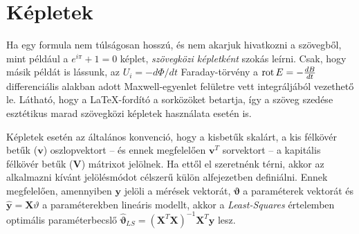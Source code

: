 \section{Képletek}
Ha egy formula nem túlságosan hosszú, és nem akarjuk hivatkozni a szövegből, mint például a $e^{i\pi}+1=0$ képlet, \emph{szövegközi képletként} szokás leírni. Csak, hogy másik példát is lássunk, az $U_i=-d\Phi/dt$ Faraday-törvény a $\rot E=-\frac{dB}{dt}$ differenciális alakban adott Maxwell-egyenlet felületre vett integráljából vezethető le. Látható, hogy a \LaTeX-fordító a sorközöket betartja, így a szöveg szedése esztétikus marad szövegközi képletek használata esetén is.

Képletek esetén az általános konvenció, hogy a kisbetűk skalárt, a kis félkövér betűk ($\mathbf{v}$) oszlopvektort -- és ennek megfelelően $\mathbf{v}^T$ sorvektort -- a kapitális félkövér betűk ($\mathbf{V}$) mátrixot jelölnek. Ha ettől el szeretnénk térni, akkor az alkalmazni kívánt jelölésmódot célszerű külön alfejezetben definiálni. Ennek megfelelően, amennyiben $\mathbf{y}$ jelöli a mérések vektorát, $\mathbf{\vartheta}$ a paraméterek vektorát és $\hat{\mathbf{y}}=\mathbf{X}\vartheta$ a paraméterekben lineáris modellt, akkor a \emph{Least-Squares} értelemben optimális paraméterbecslő $\hat{\mathbf{\vartheta}}_{LS}=(\mathbf{X}^T\mathbf{X})^{-1}\mathbf{X}^T\mathbf{y}$ lesz.

